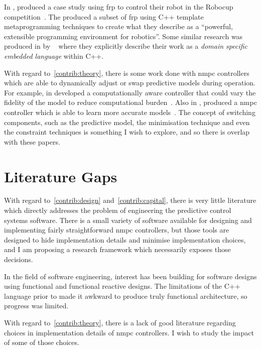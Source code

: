 In \citeyear{Peterson2001}, \citeauthor{Peterson2001} produced a case study
using \ac{frp} to control their robot in the  Robocup
competition~\cite{Peterson2001}. The produced a subset of \ac{frp} using C++
template metaprogramming techniques to create what they describe as a
``powerful, extensible programming environment for robotics''. Some similar
research was produced in \citeyear{Xiangtian2002} by
\citeauthor{Xiangtian2002}~\cite{Xiangtian2002} where they explicitly describe
their work as a \emph{domain specific embedded language} within C++.

With regard to~\ref{contrib:theory}, there is some work done with \ac{nmpc}
controllers which are able to dynamically adjust or swap predictive models
during operation. For example, in  \citeauthor[and related
work]{Zhang2016} developed a computationally aware controller that could vary
the fidelity of the model to reduce computational burden~\cite[and related
work]{Zhang2016}. Also in , \citeauthor{Ostafew2016} produced a
\ac{nmpc} controller which is able to learn more accurate
models~\cite{Ostafew2016}. The concept of switching components, such as the
predictive model, the minimisation technique and even the constraint techniques
is something I wish to explore, and so there is overlap with these papers.

\section{Literature Gaps}%
\label{sec:literature-gaps}


With regard to~\ref{contrib:design} and~\ref{contrib:capital}, there is very
little literature which directly addresses the problem of engineering the
predictive control systems software. There is a small variety of software
available for designing and implementing fairly straightforward \ac{nmpc}
controllers, but those tools are designed to hide implementation details and
minimise implementation choices, and I am proposing a research framework which
necessarily exposes those decisions.

In the field of software engineering, interest has been building for software
designs using functional and functional reactive designs. The limitations of the
C++ language prior to  made it awkward to produce truly functional
architecture, so progress was limited.

With regard to~\ref{contrib:theory}, there is a lack of good literature
regarding choices in implementation details of \ac{nmpc} controllers. I wish to
study the impact of some of those choices.


